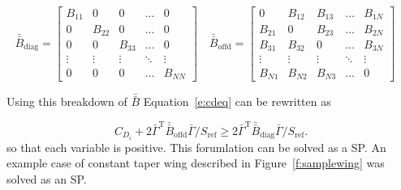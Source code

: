 \documentclass[10pt, a4paper]{article}
\begin{document}
\begin{equation*}
    \bar{\bar{B}}_{\mathrm{diag}} =  
    \begin{bmatrix} 
        B_{11} & 0 & 0 & \dots & 0 \\
        0 & B_{22} & 0 & \dots & 0 \\
        0 & 0 & B_{33} & \dots & 0 \\
        \vdots & \vdots & \vdots & \ddots & \vdots \\
        0 & 0 & 0 & \dots & B_{NN}
    \end{bmatrix} \quad
    \bar{\bar{B}}_{\mathrm{offd}} =  
    \begin{bmatrix} 
        0      & B_{12} & B_{13} & \dots  & B_{1N} \\
        B_{21} & 0      & B_{23} & \dots  & B_{2N} \\
        B_{31} & B_{32} & 0      & \dots  & B_{3N} \\
        \vdots & \vdots & \vdots & \ddots & \vdots \\
        B_{N1} & B_{N2} & B_{N3} & \dots  & 0
    \end{bmatrix} \quad
\end{equation*}

Using this breakdown of $\bar{\bar{B}}$ Equation~\ref{e:cdeq} can be rewritten as

\begin{equation}
    C_{D_i} + 2\bar{\Gamma}^{\mathrm{T}} \bar{\bar{B}}_{\mathrm{offd}} \bar{\Gamma}/S_{\mathrm{ref}} \geq 2 \bar{\Gamma}^{\mathrm{T}} \bar{\bar{B}}_{\mathrm{diag}} \bar{\Gamma}/S_{\mathrm{ref}}.
\end{equation}
so that each variable is positive. This forumlation can be solved as a SP.  An example case of constant taper wing described in Figure~\ref{f:samplewing} was solved as an SP.
\end{document}
